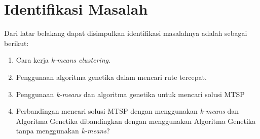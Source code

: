 \section{Identifikasi Masalah}

Dari latar belakang dapat disimpulkan identifikasi masalahnya adalah sebagai berikut:
\begin{enumerate}
	\item Cara kerja \textit{k-means clustering}.
	\item Penggunaan algoritma genetika dalam mencari rute tercepat.
	\item Penggunaan \textit{k-means} dan algoritma genetika untuk mencari solusi MTSP
	\item Perbandingan mencari solusi MTSP dengan menggunakan \textit{k-means} dan Algoritma Genetika dibandingkan dengan menggunakan Algoritma Genetika tanpa menggunakan \textit{k-means}?
\end{enumerate}